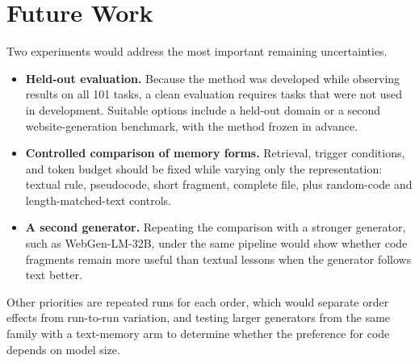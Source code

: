 \section{Future Work}
Two experiments would address the most important remaining uncertainties.
\begin{itemize}
  \item \textbf{Held-out evaluation.} Because the method was developed while observing results on all 101 tasks, a clean evaluation requires tasks that were not used in development. Suitable options include a held-out domain or a second website-generation benchmark, with the method frozen in advance.
  \item \textbf{Controlled comparison of memory forms.} Retrieval, trigger conditions, and token budget should be fixed while varying only the representation: textual rule, pseudocode, short fragment, complete file, plus random-code and length-matched-text controls.
  \item \textbf{A second generator.} Repeating the comparison with a stronger generator, such as WebGen-LM-32B, under the same pipeline would show whether code fragments remain more useful than textual lessons when the generator follows text better.
\end{itemize}
Other priorities are repeated runs for each order, which would separate order effects from run-to-run variation, and testing larger generators from the same family with a text-memory arm to determine whether the preference for code depends on model size.
